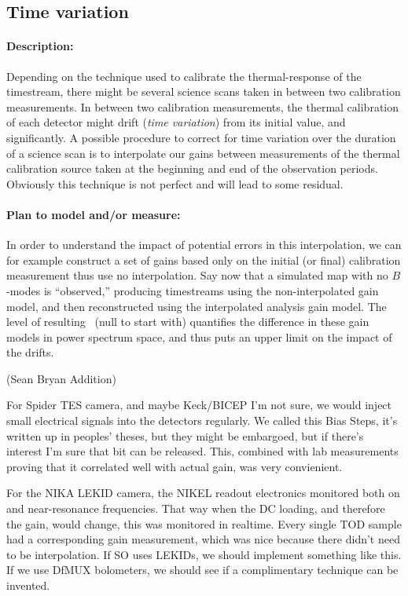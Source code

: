 \subsection{Time variation}

\paragraph{Description:}
Depending on the technique used to calibrate the thermal-response of the timestream, there might be several science scans taken in between two calibration measurements. 
In between two calibration measurements, the thermal calibration of each detector might drift (\emph{time variation}) from its initial value, and significantly.
A possible procedure to correct for time variation over the duration of a science scan is to interpolate our gains between measurements of the thermal calibration source taken at the beginning and end of the observation periods.
Obviously this technique is not perfect and will lead to some residual.

\paragraph{Plan to model and/or measure:}
In order to understand the impact of potential errors in this interpolation, we can for example construct a set of gains based only on the initial (or final) calibration measurement thus use no interpolation.
Say now that a simulated map with no $B$-modes is ``observed,'' producing timestreams using the non-interpolated gain model, and then reconstructed using the interpolated analysis gain model. 
The level of resulting \clbb\ (null to start with) quantifies the difference in these gain models in power spectrum space, and thus puts an upper limit on the impact of the drifts.


(Sean Bryan Addition)

For Spider TES camera, and maybe Keck/BICEP I'm not sure, we would inject small electrical signals into the detectors regularly. We called this Bias Steps, it's written up in peoples' theses, but they might be embargoed, but if there's interest I'm sure that bit can be released. This, combined with lab measurements proving that it correlated well with actual gain, was very convienient.

For the NIKA LEKID camera, the NIKEL readout electronics monitored both on and near-resonance frequencies. That way when the DC loading, and therefore the gain, would change, this was monitored in realtime. Every single TOD sample had a corresponding gain measurement, which was nice because there didn't need to be interpolation. If SO uses LEKIDs, we should implement something like this. If we use DfMUX bolometers, we should see if a complimentary technique can be invented.

